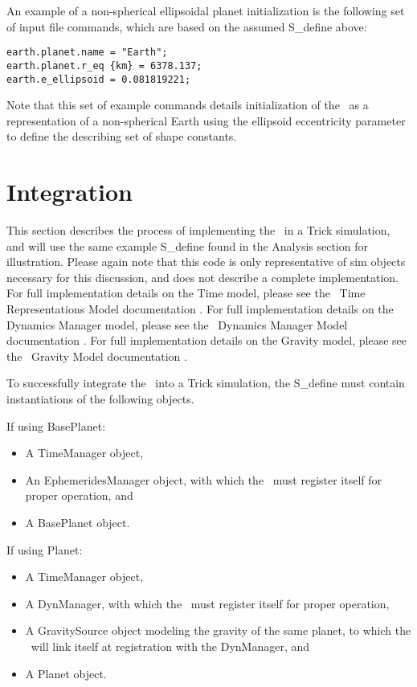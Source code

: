 An example of a non-spherical ellipsoidal planet initialization is the following
set of input file commands, which are based on the assumed S\_define above:

\begin{verbatim}
earth.planet.name = "Earth";
earth.planet.r_eq {km} = 6378.137;
earth.e_ellipsoid = 0.081819221;
\end{verbatim}

Note that this set of example commands details initialization of the
\planetDesc\ as a representation of a non-spherical Earth using the ellipsoid
eccentricity parameter to define the describing set of shape constants.


\section{Integration}

This section describes the process of implementing the \planetDesc\ in a Trick
simulation, and will use the same example S\_define found in the Analysis
section for illustration. Please again note that this code is only
representative of sim objects necessary for this discussion, and does not
describe a complete implementation. For full implementation details on the Time
model, please see the \JEODid\ Time Representations Model documentation
\cite{dynenv:TIME}. For full implementation details on the Dynamics Manager
model, please see the \JEODid\ Dynamics Manager Model documentation
\cite{dynenv:DYNMANAGER}. For full implementation details on the Gravity model,
please see the \JEODid\ Gravity Model documentation \cite{dynenv:GRAVITY}.

To successfully integrate the \planetDesc\ into a Trick simulation, the
S\_define must contain instantiations of the following objects.

If using BasePlanet:
\begin{itemize}
\item A TimeManager object,
\item An EphemeridesManager object, with which the \planetDesc\ must register
itself for proper operation, and
\item A BasePlanet object.
\end{itemize}

If using Planet:
\begin{itemize}
\item A TimeManager object,
\item A DynManager, with which the \planetDesc\ must register itself
for proper operation,
\item A GravitySource object modeling the gravity of the same planet, to which
the \planetDesc\ will link itself at registration with the DynManager, and
\item A Planet object.
\end{itemize}

